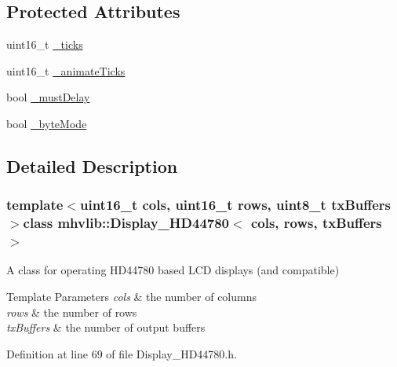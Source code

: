 \subsection*{Protected Attributes}
\begin{DoxyCompactItemize}
\item 
uint16\-\_\-t \hyperlink{classmhvlib_1_1_display___h_d44780_a22c01174d10b5567e3862f05c4e3ffe4}{\-\_\-ticks}
\item 
uint16\-\_\-t \hyperlink{classmhvlib_1_1_display___h_d44780_a1fc6a61b685899443b518c06ae809f3e}{\-\_\-animate\-Ticks}
\item 
bool \hyperlink{classmhvlib_1_1_display___h_d44780_a636ba89b43ae6fe21cdeb0c225d1b6ca}{\-\_\-must\-Delay}
\item 
bool \hyperlink{classmhvlib_1_1_display___h_d44780_ac8a09ff374404a58c3358dec12281014}{\-\_\-byte\-Mode}
\end{DoxyCompactItemize}


\subsection{Detailed Description}
\subsubsection*{template$<$uint16\-\_\-t cols, uint16\-\_\-t rows, uint8\-\_\-t tx\-Buffers$>$class mhvlib\-::\-Display\-\_\-\-H\-D44780$<$ cols, rows, tx\-Buffers $>$}

A class for operating H\-D44780 based L\-C\-D displays (and compatible) 
\begin{DoxyTemplParams}{Template Parameters}
{\em cols} & the number of columns \\
\hline
{\em rows} & the number of rows \\
\hline
{\em tx\-Buffers} & the number of output buffers \\
\hline
\end{DoxyTemplParams}


Definition at line 69 of file Display\-\_\-\-H\-D44780.\-h.



